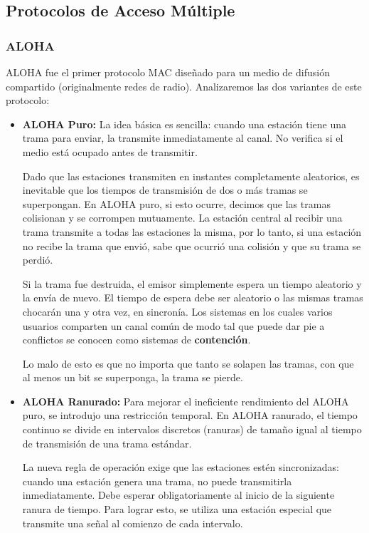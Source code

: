 \subsection{Protocolos de Acceso Múltiple}

\subsubsection{ALOHA}

ALOHA fue el primer protocolo MAC diseñado para un medio de difusión compartido (originalmente redes de radio). Analizaremos las dos variantes de este protocolo:

\begin{itemize}
    \item \textbf{ALOHA Puro:} La idea básica es sencilla: cuando una estación tiene una trama para enviar, la transmite inmediatamente al canal. No verifica si el medio está ocupado antes de transmitir. 
    
    Dado que las estaciones transmiten en instantes completamente aleatorios, es inevitable que los tiempos de transmisión de dos o más tramas se superpongan. En ALOHA puro, si esto ocurre, decimos que las tramas colisionan y se corrompen mutuamente. La estación central al recibir una trama transmite a todas las estaciones la misma, por lo tanto, si una estación no recibe la trama que envió, sabe que ocurrió una colisión y que su trama se perdió.
    
    Si la trama fue destruida, el emisor simplemente espera un tiempo aleatorio y la envía de nuevo. El tiempo de espera debe ser aleatorio o las mismas tramas chocarán una y otra vez, en sincronía. Los sistemas en los cuales varios usuarios comparten un canal común de modo tal que puede dar pie a conflictos se conocen como sistemas de \textbf{contención}.

    Lo malo de esto es que no importa que tanto se solapen las tramas, con que al menos un bit se superponga, la trama se pierde.
    
    \item \textbf{ALOHA Ranurado:} Para mejorar el ineficiente rendimiento del ALOHA puro, se introdujo una restricción temporal. En ALOHA ranurado, el tiempo continuo se divide en intervalos discretos (ranuras) de tamaño igual al tiempo de transmisión de una trama estándar.
    
    La nueva regla de operación exige que las estaciones estén sincronizadas: cuando una estación genera una trama, no puede transmitirla inmediatamente. Debe esperar obligatoriamente al inicio de la siguiente ranura de tiempo. Para lograr esto, se utiliza una estación especial que transmite una señal al comienzo de cada intervalo.
    

\end{itemize}
